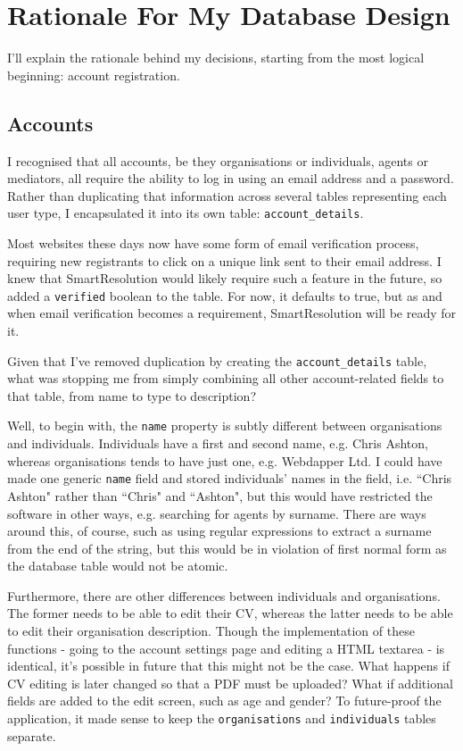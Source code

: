 \chapter{Rationale For My Database Design} \label{appendix:database}

I'll explain the rationale behind my decisions, starting from the most logical beginning: account registration.

\section{Accounts}

I recognised that all accounts, be they organisations or individuals, agents or mediators, all require the ability to log in using an email address and a password. Rather than duplicating that information across several tables representing each user type, I encapsulated it into its own table: \lstinline{account_details}.

Most websites these days now have some form of email verification process, requiring new registrants to click on a unique link sent to their email address. I knew that SmartResolution would likely require such a feature in the future, so added a \lstinline{verified} boolean to the table. For now, it defaults to true, but as and when email verification becomes a requirement, SmartResolution will be ready for it.

Given that I've removed duplication by creating the \lstinline{account_details} table, what was stopping me from simply combining all other account-related fields to that table, from name to type to description?

Well, to begin with, the \lstinline{name} property is subtly different between organisations and individuals. Individuals have a first and second name, e.g. Chris Ashton, whereas organisations tends to have just one, e.g. Webdapper Ltd. I could have made one generic \lstinline{name} field and stored individuals' names in the field, i.e. ``Chris Ashton" rather than ``Chris" and ``Ashton", but this would have restricted the software in other ways, e.g. searching for agents by surname. There are ways around this, of course, such as using regular expressions to extract a surname from the end of the string, but this would be in violation of first normal form as the database table would not be atomic.

Furthermore, there are other differences between individuals and organisations. The former needs to be able to edit their CV, whereas the latter needs to be able to edit their organisation description. Though the implementation of these functions - going to the account settings page and editing a HTML textarea - is identical, it's possible in future that this might not be the case. What happens if CV editing is later changed so that a PDF must be uploaded? What if additional fields are added to the edit screen, such as age and gender? To future-proof the application, it made sense to keep the \lstinline{organisations} and \lstinline{individuals} tables separate.

